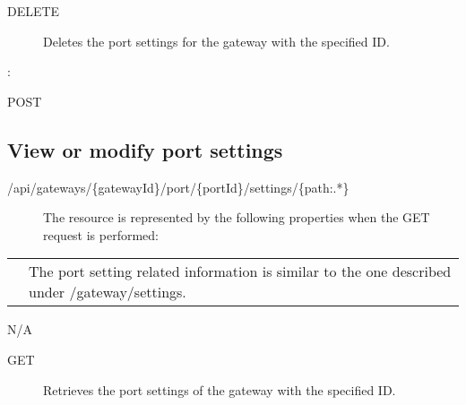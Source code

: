 \documentclass[letterpaper,10pt,english]{sphinxmanual}
\begin{document}
\begin{sphinxVerbatim}[commandchars=\\\{\}]
\end{sphinxVerbatim}
\begin{description}
\item[{ DELETE}] \leavevmode
Deletes the port settings for the gateway with the specified ID.

\end{description}

:

\begin{sphinxVerbatim}[commandchars=\\\{\}]
\end{sphinxVerbatim}

 POST


\subsection{View or modify port settings}
\label{\detokenize{restapi:view-or-modify-port-settings}}
 /api/gateways/\{gatewayId\}/port/\{portId\}/settings/\{path:.*\}
\begin{description}
\item[{}] \leavevmode
The resource is represented by the following properties when the GET request is performed:

\end{description}


\begin{savenotes}\sphinxattablestart
\centering
\begin{tabulary}{\linewidth}[t]{|T|T|}
\hline

&
\\
\hline
{}
&
The port setting related information is similar to the one described under /gateway/settings.
\\
\hline
\end{tabulary}
\par
\sphinxattableend\end{savenotes}

 N/A
\begin{description}
\item[{ GET}] \leavevmode
Retrieves the port settings of the gateway with the specified ID.

\end{description}
\end{document}
